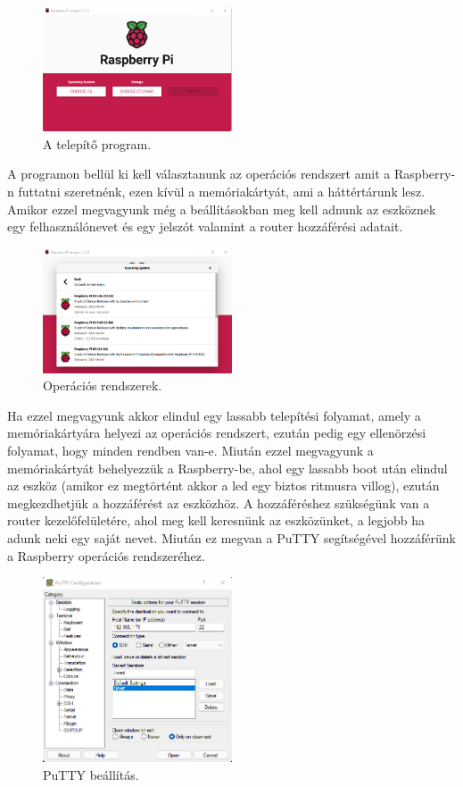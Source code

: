 \documentclass[a4paper,12pt,oneside]{report}
\begin{document}
\begin{figure}[htbp]
	\centering
	\includegraphics[width=0.5\textwidth]{fig/Imager.png}
	\caption{A telepítő program.}
	\label{fig-Imager}
\end{figure}

A programon bellül ki kell választanunk az operációs rendszert amit a Raspberry-n futtatni szeretnénk, ezen kívül a memóriakártyát, 
ami a háttértárunk lesz. Amikor ezzel megvagyunk még a beállításokban meg kell adnunk az eszköznek egy felhasználónevet és egy jelszót
valamint a router hozzáférési adatait.

\begin{figure}[htbp]
	\centering
	\includegraphics[width=0.5\textwidth]{fig/os.png}
	\caption{Operációs rendszerek.}
	\label{fig-os}
\end{figure}

Ha ezzel megvagyunk akkor elindul egy lassabb telepítési folyamat, amely a memóriakártyára helyezi az operációs rendszert, ezután pedig
egy ellenörzési folyamat, hogy minden rendben van-e.
Miután ezzel megvagyunk a memóriakártyát behelyezzük a Raspberry-be, ahol egy lassabb boot után elindul az eszköz (amikor ez megtörtént
akkor a led egy biztos ritmusra villog), ezután megkezdhetjük a hozzáférést az eszközhöz. 
A hozzáféréshez szükségünk van a router kezelőfelületére, ahol meg kell keresnünk az eszközünket, a legjobb ha adunk neki
egy saját nevet. Miután ez megvan a PuTTY segítségével hozzáférünk a Raspberry operációs rendszeréhez.

\begin{figure}[htbp]
	\centering
	\includegraphics[width=0.5\textwidth]{fig/putty.png}
	\caption{PuTTY beállítás.}
	\label{fig-putty}
\end{figure}
\end{document}
